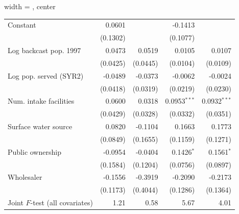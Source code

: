 \begin{table}[htbp]
\begin{adjustbox}{width = \textwidth, center}
\begin{tabular}{lrrrr}
         \midrule 
         Constant                        & 0.0601                   &                          & -0.1413                  &   \\   
                                         & (0.1302)                 &                          & (0.1077)                 &   \\   
         Log backcast pop. 1997          & 0.0473                   & 0.0519                   & 0.0105                   & 0.0107\\   
                                         & (0.0425)                 & (0.0445)                 & (0.0104)                 & (0.0109)\\   
         Log pop. served (SYR2)          & -0.0489                  & -0.0373                  & -0.0062                  & -0.0024\\   
                                         & (0.0418)                 & (0.0319)                 & (0.0219)                 & (0.0230)\\   
         Num. intake facilities          & 0.0600                   & 0.0318                   & 0.0953$^{***}$           & 0.0932$^{***}$\\   
                                         & (0.0429)                 & (0.0328)                 & (0.0332)                 & (0.0351)\\   
         Surface water source            & 0.0820                   & -0.1104                  & 0.1663                   & 0.1773\\   
                                         & (0.0849)                 & (0.1655)                 & (0.1159)                 & (0.1271)\\   
         Public ownership                & -0.0954                  & -0.0404                  & 0.1426$^{*}$             & 0.1561$^{*}$\\   
                                         & (0.1584)                 & (0.1204)                 & (0.0756)                 & (0.0897)\\   
         Wholesaler                      & -0.1556                  & -0.3919                  & -0.2090                  & -0.2173\\   
                                         & (0.1173)                 & (0.4044)                 & (0.1286)                 & (0.1364)\\   
         
         Joint $F$-test (all covariates) & 1.21                     & 0.58                     & 5.67                     & 4.01\\  
         

\end{tabular}
\end{adjustbox}
\end{table}
